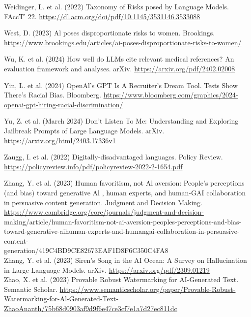 \documentclass[10pt]{article}
\begin{document}
Weidinger, L. et al. (2022) Taxonomy of Risks posed by Language Models. FAccT' 22. \href{https://dl.acm.org/doi/pdf/10.1145/3531146.3533088}{https://dl.acm.org/doi/pdf/10.1145/3531146.3533088}

West, D. (2023) Al poses disproportionate risks to women. Brookings. \href{https://www.brookings.edu/articles/ai-poses-disproportionate-risks-to-women/}{https://www.brookings.edu/articles/ai-poses-disproportionate-risks-to-women/}

Wu, K. et al. (2024) How well do LLMs cite relevant medical references? An evaluation framework and analyses. arXiv. \href{https://arxiv.org/pdf/2402.02008}{https://arxiv.org/pdf/2402.02008}

Yin, L. et al. (2024) OpenAl's GPT Is A Recruiter's Dream Tool. Tests Show There's Racial Bias. Bloomberg. \href{https://www.bloomberg.com/graphics/2024-openai-gpt-hiring-racial-discrimination/}{https://www.bloomberg.com/graphics/2024-openai-gpt-hiring-racial-discrimination/}

Yu, Z. et al. (March 2024) Don't Listen To Me: Understanding and Exploring Jailbreak Prompts of Large Language Models. arXiv. \href{https://arxiv.org/html/2403.17336v1}{https://arxiv.org/html/2403.17336v1}

Zaugg, I. et al. (2022) Digitally-disadvantaged languages. Policy Review. \href{https://policyreview.info/pdf/policyreview-2022-2-1654.pdf}{https://policyreview.info/pdf/policyreview-2022-2-1654.pdf}

Zhang, Y. et al. (2023) Human favoritism, not Al aversion: People's perceptions (and bias) toward generative Al , human experts, and human-GAI collaboration in persuasive content generation. Judgment and Decision Making. \href{https://www.cambridge.org/core/journals/judgment-and-decision-}{https://www.cambridge.org/core/journals/judgment-and-decision-}\\
making/article/human-favoritism-not-ai-aversion-peoples-perceptions-and-bias-toward-generative-aihuman-experts-and-humangai-collaboration-in-persuasive-content-\\
generation/419C4BD9CE82673EAF1D8F6C350C4FA8\\
Zhang, Y. et al. (2023) Siren's Song in the AI Ocean: A Survey on Hallucination in Large Language Models. arXiv. \href{https://arxiv.org/pdf/2309.01219}{https://arxiv.org/pdf/2309.01219}\\
Zhao, X. et al. (2023) Provable Robust Watermarking for AI-Generated Text. Semantic Scholar. \href{https://www.semanticscholar.org/paper/Provable-Robust-Watermarking-for-Al-Generated-Text-ZhaoAnanth/75b68d0903af9d9f6e47ce3cf7e1a7d27ec811dc}{https://www.semanticscholar.org/paper/Provable-Robust-Watermarking-for-Al-Generated-Text-ZhaoAnanth/75b68d0903af9d9f6e47ce3cf7e1a7d27ec811dc}
\end{document}
